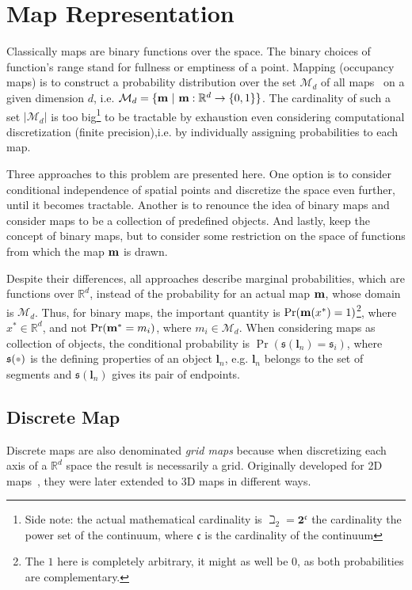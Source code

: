 \section{Map Representation}
\label{s:map_rep}
Classically maps are binary functions over the space. The binary choices of
function's range stand for fullness or emptiness of a point.
Mapping (occupancy maps) is to construct a probability distribution over the set
$\mathcal{M}_d$ of all maps~\cite{thrunprob} on a given dimension $d$, i.e.
$\mathcal{M}_d=\{\mathrm{\mathbf{m}}~|~\mathrm{\mathbf{m}}:\mathbb{R}^d\to\{0,1\}\}$. The
cardinality of such a set $|\mathcal{M}_d|$ is too big\footnote{Side note: the
actual mathematical cardinality is $\beth_2=\mathbf{2}^\mathfrak{c}$ the
cardinality the power set of the continuum, where $\mathfrak{c}$ is the
cardinality of the continuum } to be tractable by exhaustion even considering
computational discretization (finite precision),i.e. by individually
assigning probabilities to each map.

Three approaches to this problem are presented here. One option is to consider
conditional independence of spatial points and discretize the space even
further, until it becomes tractable.
Another is to renounce the idea of binary maps and consider maps to be a collection of predefined
objects. And lastly, keep the concept of binary maps, but to consider some
restriction on the space of functions from which the map $\mathrm{\mathbf{m}}$ is drawn.

Despite their differences, all approaches describe marginal probabilities, which
are functions over $\mathbb{R}^d$, instead of the probability for an actual map
$\mathrm{\mathbf{m}}$, whose domain is $\mathcal{M}_d$.
Thus, for binary maps, the important quantity is
$\Pr(\mathrm{\mathbf{m}}(x^\ast)=1)$\footnote{The $1$ here is completely arbitrary, it
might as well be $0$, as both probabilities are complementary.}, where $x^\ast
\in \mathbb{R}^d$, and not $\Pr(\mathrm{\mathbf{m}}^\ast=m_i)$, where $m_i \in
\mathcal{M}_d$. When considering maps as collection of objects, the conditional
probability is $\Pr(\mathfrak{s}(\mathbf{l}_n)=\mathfrak{s}_i)$, where
$\mathfrak{s}(\parm)$ is the defining properties of an object $\mathbf{l}_n$,
e.g. $\mathbf{l}_n$ belongs to the set of segments and $\mathfrak{s}(\mathbf{l}_n)$
gives its pair of endpoints.

\subsection{Discrete Map}

Discrete maps are also denominated \textit{grid maps} because when discretizing
each axis of a $\mathbb{R}^d$ space the result is necessarily a grid. Originally
developed for 2D maps~\cite{thrunprob}, they were later extended to 3D maps
in different ways.


